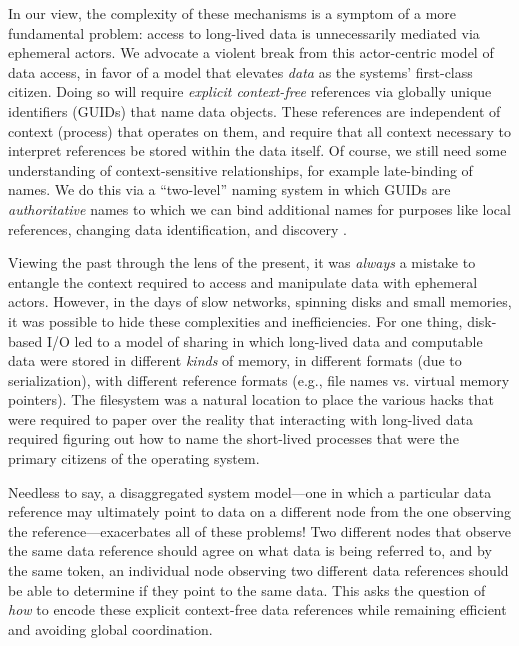 In our view, the complexity of these mechanisms is a symptom of a more fundamental problem: access to long-lived data
is unnecessarily mediated via ephemeral actors.
We advocate a violent break from this actor-centric model of data access, in favor of a model that elevates \emph{data}
as the systems' first-class citizen.  Doing so will require \emph{explicit
    context-free} references via globally unique identifiers (GUIDs) that name data objects. These
references are independent of context (\eg process) that operates on them, and require that all context necessary to interpret references
be stored within the data itself. Of course, we still need some understanding of
context-sensitive relationships, for example late-binding of names. We do this via a
``two-level'' naming system in which GUIDs are \emph{authoritative} names to which we can bind
additional names for purposes like local references, changing data identification, and discovery
.

Viewing the past through the lens of the present, it was \emph{always} a mistake to entangle the context required to access
and manipulate data with ephemeral actors.  However, in the days of slow networks, spinning disks and small memories,
it was possible to hide these complexities and inefficiencies.  For one thing, disk-based I/O led to a model of sharing in
which long-lived data and computable data were stored in different \emph{kinds} of memory, in different formats (due to serialization),
with different reference formats (e.g., file names vs. virtual memory pointers).
The filesystem was a natural location to place the various hacks that were required to paper over the reality
that interacting with long-lived data required figuring out how to name the short-lived processes that were the primary
citizens of the operating system.

Needless to say, a disaggregated system model---one in which a particular data reference may
ultimately point to data on a different node from the one observing the reference---exacerbates all of these problems!
Two different nodes that observe the same data reference should agree on what data is
being referred to, and by the same token, an individual node observing two different data references
should be able to determine if they point to the same data. This asks the question of \emph{how}
to encode these explicit context-free data references while remaining efficient and avoiding global
coordination.


